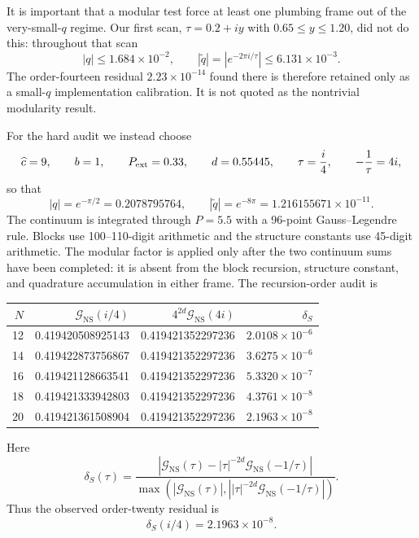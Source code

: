 \documentclass[11pt]{article}
\newcommand{\NS}{\mathrm{NS}}
\begin{document}
It is important that a modular test force at least one plumbing frame out of
the very-small-\(q\) regime.  Our first scan,
\(\tau=0.2+i y\) with \(0.65\leq y\leq1.20\), did not do this: throughout
that scan
\begin{equation}
 |q|\leq 1.684\times10^{-2},\qquad
 |\widetilde q|=|e^{-2\pi i/\tau}|\leq 6.131\times10^{-3}.
 \label{eq:torus-direct-c-small-q-calibration}
\end{equation}
The order-fourteen residual \(2.23\times10^{-14}\) found there is therefore
retained only as a small-\(q\) implementation calibration.  It is not quoted
as the nontrivial modularity result.

For the hard audit we instead choose
\begin{equation}
 \widehat c=9,\qquad b=1,\qquad P_{\rm ext}=0.33,
 \qquad d=0.55445,\qquad \tau=\frac{i}{4},\qquad
 -\frac1\tau=4i,
 \label{eq:torus-direct-c-modularity-parameters}
\end{equation}
so that
\begin{equation}
 |q|=e^{-\pi/2}=0.2078795764,\qquad
 |\widetilde q|=e^{-8\pi}=1.216155671\times10^{-11}.
 \label{eq:torus-direct-c-hard-nomes}
\end{equation}
The continuum is integrated through \(P=5.5\) with a 96-point
Gauss--Legendre rule.  Blocks use 100--110-digit arithmetic and the structure
constants use 45-digit arithmetic.  The modular factor is applied only after
the two continuum sums have been completed: it is absent from the block
recursion, structure constant, and quadrature accumulation in either frame.
The recursion-order audit is
\begin{center}
\scriptsize
\begin{tabular}{@{}rrrr@{}}
\toprule
\(N\) & \(\mathcal G_{\NS}(i/4)\)
 & \(4^{2d}\mathcal G_{\NS}(4i)\) & \(\delta_S\)\\
\midrule
12 & 0.419420508925143 & 0.419421352297236 & \(2.0108\times10^{-6}\)\\
14 & 0.419422873756867 & 0.419421352297236 & \(3.6275\times10^{-6}\)\\
16 & 0.419421128663541 & 0.419421352297236 & \(5.3320\times10^{-7}\)\\
18 & 0.419421333942803 & 0.419421352297236 & \(4.3761\times10^{-8}\)\\
20 & 0.419421361508904 & 0.419421352297236 & \(2.1963\times10^{-8}\)\\
\bottomrule
\end{tabular}
\end{center}
Here
\begin{equation}
 \delta_S(\tau)
 =\frac{\left|\mathcal G_{\NS}(\tau)
       -|\tau|^{-2d}\mathcal G_{\NS}(-1/\tau)\right|}
 {\max\!\left(\left|\mathcal G_{\NS}(\tau)\right|,
 \left||\tau|^{-2d}\mathcal G_{\NS}(-1/\tau)\right|\right)}.
 \label{eq:torus-direct-c-modular-residual}
\end{equation}
Thus the observed order-twenty residual is
\begin{equation}
 \delta_S(i/4)=2.1963\times10^{-8}.
 \label{eq:torus-direct-c-modular-result}
\end{equation}
\end{document}
